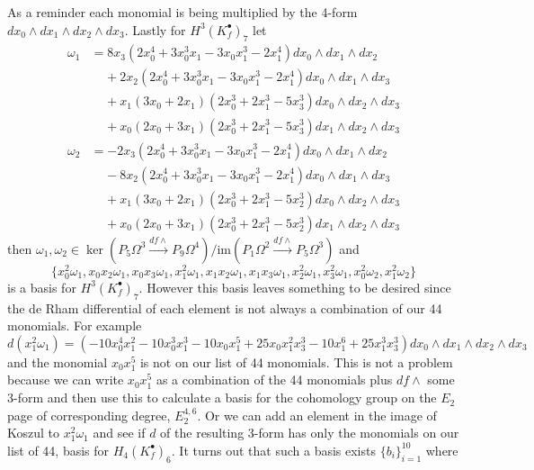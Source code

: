 \documentclass[10pt,oneside,reqno]{amsart}
\begin{document}
\begin{flushleft}
		As a reminder each monomial is being multiplied by the 4-form $dx_0\wedge dx_1\wedge dx_2\wedge dx_3$.  Lastly for $H^3(K_f^{\bullet})_7$ let
		\begin{align*}
			\omega_1 & =8x_3(2x_0^4+3x_0^3x_1-3x_0x_1^3-2x_1^4)dx_0\wedge dx_1\wedge dx_2 \\
			& \;\;\;\;+2x_2(2x_0^4+3x_0^3x_1-3x_0x_1^3-2x_1^4)dx_0\wedge dx_1\wedge dx_3 \\
			& \;\;\;\;+x_1(3x_0+2x_1)(2x_0^3+2x_1^3-5x_3^3)dx_0\wedge dx_2\wedge dx_3 \\
			& \;\;\;\;+x_0(2x_0+3x_1)(2x_0^3+2x_1^3-5x_3^3)dx_1\wedge dx_2\wedge dx_3 \\
			\omega_2 & =-2x_3(2x_0^4+3x_0^3x_1-3x_0x_1^3-2x_1^4)dx_0\wedge dx_1\wedge dx_2 \\
			& \;\;\;\;-8x_2(2x_0^4+3x_0^3x_1-3x_0x_1^3-2x_1^4)dx_0\wedge dx_1\wedge dx_3 \\
			& \;\;\;\;+x_1(3x_0+2x_1)(2x_0^3+2x_1^3-5x_2^3)dx_0\wedge dx_2\wedge dx_3 \\
			& \;\;\;\;+x_0(2x_0+3x_1)(2x_0^3+2x_1^3-5x_2^3)dx_1\wedge dx_2\wedge dx_3
		\end{align*}
		then $\omega_1,\omega_2\in\ker(P_5\Omega^3\xrightarrow{df\wedge}P_9\Omega^4)/\text{im}(P_1\Omega^2\xrightarrow{df\wedge}P_5\Omega^3)$ and
		\begin{equation*}
			\{x_0^2\omega_1,x_0x_2\omega_1,x_0x_3\omega_1,x_1^2\omega_1,x_1x_2\omega_1,x_1x_3\omega_1,x_2^2\omega_1,x_3^2\omega_1,x_0^2\omega_2,x_1^2\omega_2\}
		\end{equation*}
		is a basis for $H^3(K_f^{\bullet})_7$.  However this basis leaves something to be desired since the de Rham differential of each element is not always a combination of our 44 monomials.  For example
		\begin{equation*}
			d(x_1^2\omega_1)=(-10x_0^4x_1^2-10x_0^3x_1^3-10x_0x_1^5+25x_0x_1^2x_3^3-10x_1^6+25x_1^3x_3^3)dx_0\wedge dx_1\wedge dx_2\wedge dx_3
		\end{equation*}
		and the monomial $x_0x_1^5$ is not on our list of 44 monomials.  This is not a problem because we can write $x_0x_1^5$ as a combination of the 44 monomials plus $df\wedge$ some 3-form and then use this to calculate a basis for the cohomology group on the $E_2$ page of corresponding degree, $E_2^{4,6}$.  Or we can add an element in the image of Koszul to $x_1^2\omega_1$ and see if $d$ of the resulting 3-form has only the monomials on our list of 44, basis for $H_4(K_f^{\bullet})_6$.  It turns out that such a basis exists $\{b_i\}_{i=1}^{10}$ where
		

\end{flushleft}
\end{document}
